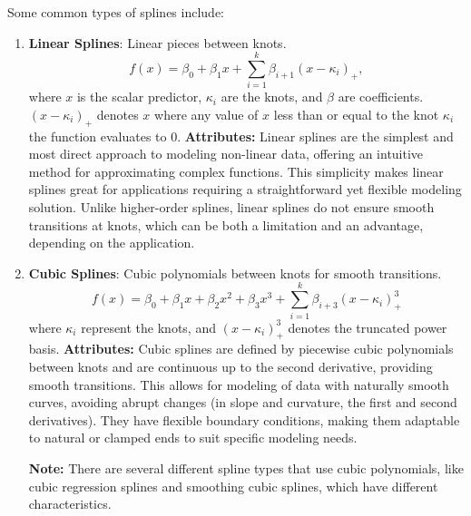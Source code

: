 \documentclass[12pt, twoside,hidelinks]{article}
\theoremstyle{definition}
\numberwithin{equation}{section}
\begin{document}
Some common types of splines include:
\begin{enumerate}
    \item \textbf{Linear Splines}: 
    Linear pieces between knots.
    \begin{equation}
        f(x) = \beta_0 + \beta_1 x + \sum_{i=1}^{k} \beta_{i+1} (x - \kappa_i)_+,
        \label{eq:linear_splines}
    \end{equation}
    where \( x \) is the scalar predictor, \( \kappa_i \) are the knots, and \( \beta \) are coefficients. \((x - \kappa_i)_+\) denotes \( x \) where any value of \( x \) less than or equal to the knot \(\kappa_i\) the function evaluates to 0.
    \newline
    \textbf{Attributes:} Linear splines are the simplest and most direct approach to modeling non-linear data, offering an intuitive method for approximating complex functions. This simplicity makes linear splines great for applications requiring a straightforward yet flexible modeling solution. Unlike higher-order splines, linear splines do not ensure smooth transitions at knots, which can be both a limitation and an advantage, depending on the application.


    \item \textbf{Cubic Splines}: 
    Cubic polynomials between knots for smooth transitions.
    \begin{equation}
        f(x) = \beta_0 + \beta_1 x + \beta_2 x^2 + \beta_3 x^3 + \sum_{i=1}^{k} \beta_{i+3} (x - \kappa_i)_+^3
        \label{eq:cubic_splines}
    \end{equation}
    where \(\kappa_i\) represent the knots, and \((x - \kappa_i)^3_+\) denotes the truncated power basis.
    \newline
    \textbf{Attributes:} 
    Cubic splines are defined by piecewise cubic polynomials between knots and are continuous up to the second derivative, providing smooth transitions. This allows for modeling of data with naturally smooth curves, avoiding abrupt changes (in slope and curvature, the first and second derivatives). They have flexible boundary conditions, making them adaptable to natural or clamped ends to suit specific modeling needs.
\newline

    \textbf{Note:} There are several different spline types that use cubic polynomials, like cubic regression splines and smoothing cubic splines, which have different characteristics.
    

\end{enumerate}
\end{document}
